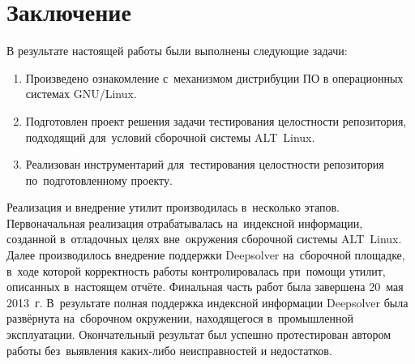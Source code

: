 \section*{Заключение}

В результате настоящей работы были выполнены следующие задачи:

\begin{enumerate}
\item{Произведено ознакомление с~механизмом дистрибуции ПО в операционных системах GNU/Linux.}
\item{Подготовлен проект решения задачи тестирования целостности репозитория,
подходящий для~условий сборочной системы ALT~Linux.}
\item{Реализован инструментарий для~тестирования целостности репозитория по~подготовленному проекту.}
\end{enumerate}

Реализация и внедрение утилит производилась в~несколько этапов. 
Первоначальная реализация отрабатывалась на~индексной информации, созданной в~отладочных целях вне~окружения сборочной системы ALT~Linux.
Далее производилось внедрение поддержки Deepsolver на~сборочной площадке,
в~ходе которой корректность работы контролировалась при~помощи утилит, описанных в~настоящем отчёте.
Финальная часть работ была завершена 20~мая 2013~г.
В~результате полная поддержка индексной информации Deepsolver была развёрнута на~сборочном окружении, 
находящегося в~промышленной эксплуатации.
Окончательный результат был успешно протестирован автором работы
без~выявления каких-либо неисправностей и недостатков.
